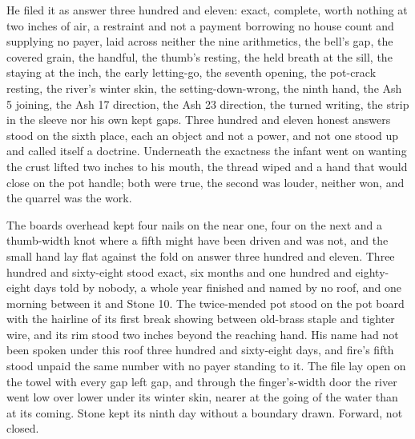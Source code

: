 He filed it as answer three hundred and eleven: exact, complete, worth nothing at two inches of air, a restraint and not a payment borrowing no house count and supplying no payer, laid across neither the nine arithmetics, the bell's gap, the covered grain, the handful, the thumb's resting, the held breath at the sill, the staying at the inch, the early letting-go, the seventh opening, the pot-crack resting, the river's winter skin, the setting-down-wrong, the ninth hand, the Ash 5 joining, the Ash 17 direction, the Ash 23 direction, the turned writing, the strip in the sleeve nor his own kept gaps. Three hundred and eleven honest answers stood on the sixth place, each an object and not a power, and not one stood up and called itself a doctrine. Underneath the exactness the infant went on wanting the crust lifted two inches to his mouth, the thread wiped and a hand that would close on the pot handle; both were true, the second was louder, neither won, and the quarrel was the work.

The boards overhead kept four nails on the near one, four on the next and a thumb-width knot where a fifth might have been driven and was not, and the small hand lay flat against the fold on answer three hundred and eleven. Three hundred and sixty-eight stood exact, six months and one hundred and eighty-eight days told by nobody, a whole year finished and named by no roof, and one morning between it and Stone 10. The twice-mended pot stood on the pot board with the hairline of its first break showing between old-brass staple and tighter wire, and its rim stood two inches beyond the reaching hand. His name had not been spoken under this roof three hundred and sixty-eight days, and fire's fifth stood unpaid the same number with no payer standing to it. The file lay open on the towel with every gap left gap, and through the finger's-width door the river went low over lower under its winter skin, nearer at the going of the water than at its coming. Stone kept its ninth day without a boundary drawn. Forward, not closed.
